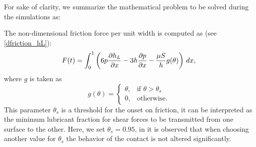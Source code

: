 For sake of clarity, we summarize the mathematical problem to be solved during the simulations as:


The non-dimensional friction force per unit width is computed as (see \eqref{dfriction_hL}):
\begin{equation} \label{eq:adim-friction}
F(t) = \int_0^1
\left(6p\parder{h_{L}}{x} -3h\parder{p}{x} - \frac{\mu S}{h}g(\theta)
\right )\,dx,
\end{equation}
where $g$ is taken as \begin{equation}
g(\theta) = \left \{ \begin{array}{ll}
\theta, & \text{if }\theta > \theta_s \\
0, & \text{otherwise.} \end{array}\right.
\end{equation}
This parameter $\theta_s$ is a threshold for the onset on friction, it can be interpreted as the minimum lubricant fraction for shear forces to be transmitted from one surface to the other. Here, we set $\theta_s=0.95$, in \cite{checo2014a} it is observed that when choosing another value for $\theta_s$ the behavior of the contact is not altered significantly.


